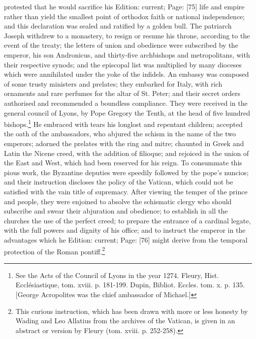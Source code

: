 protested that he would sacrifice his Edition: current; Page: [75] life and empire rather than yield the smallest point of orthodox faith or national independence; and this declaration was sealed and ratified by a golden bull. The patriarch Joseph withdrew to a monastery, to resign or resume his throne, according to the event of the treaty; the letters of union and obedience were subscribed by the emperor, his son Andronicus, and thirty-five archbishops and metropolitans, with their respective synods; and the episcopal list was multiplied by many dioceses which were annihilated under the yoke of the infidels. An embassy was composed of some trusty ministers and prelates; they embarked for Italy, with rich ornaments and rare perfumes for the altar of St. Peter; and their secret orders authorised and recommended a boundless compliance. They were received in the general council of Lyons, by Pope Gregory the Tenth, at the head of five hundred bishops.\footnote{See the Acts of the Council of Lyons in the year 1274. Fleury, Hist. Ecclésiastique, tom. xviii. p. 181-199. Dupin, Bibliot. Eccles. tom. x. p. 135. [George Acropolites was the chief ambassador of Michael.]} He embraced with tears his longlost and repentant children; accepted the oath of the ambassadors, who abjured the schism in the name of the two emperors; adorned the prelates with the ring and mitre; chaunted in Greek and Latin the Nicene creed, with the addition of filioque; and rejoiced in the union of the East and West, which had been reserved for his reign. To consummate this pious work, the Byzantine deputies were speedily followed by the pope\texthebrew{}’s nuncios; and their instruction discloses the policy of the Vatican, which could not be satisfied with the vain title of supremacy. After viewing the temper of the prince and people, they were enjoined to absolve the schismatic clergy who should subscribe and swear their abjuration and obedience; to establish in all the churches the use of the perfect creed; to prepare the entrance of a cardinal legate, with the full powers and dignity of his office; and to instruct the emperor in the advantages which he Edition: current; Page: [76] might derive from the temporal protection of the Roman pontiff.\footnote{This curious instruction, which has been drawn with more or less honesty by Wading and Leo Allatius from the archives of the Vatican, is given in an abstract or version by Fleury (tom. xviii. p. 252-258).}

